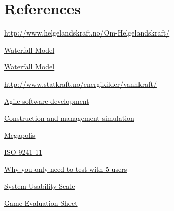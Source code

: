 \chapter{References}

\begin{thebibliography}{99}

	\href {http://www.helgelandskraft.no/Om-Helgelandskraft/}{http://www.helgelandskraft.no/Om-Helgelandskraft/}

	\href {http://en.wikipedia.org/wiki/Waterfall_model}{Waterfall Model}

	\href {http://searchsoftwarequality.techtarget.com/definition/waterfall-model}{Waterfall Model}

	\href {http://www.statkraft.no/energikilder/vannkraft/}{http://www.statkraft.no/energikilder/vannkraft/}

	\href {http://en.wikipedia.org/wiki/Agile_software_development}{Agile software development}

	\href {http://en.wikipedia.org/wiki/Construction_and_management_simulation}{Construction and management simulation}

	\href {https://play.google.com/store/apps/details?id=com.socialquantum.acityint}{Megapolis}

	\href {http://en.wikipedia.org/wiki/ISO_9241#ISO_9241-11}{ISO 9241-11}

	\href {http://www.nngroup.com/articles/why-you-only-need-to-test-with-5-users/}{Why you only need to test with 5 users}

	\href {http://www.measuringusability.com/sus.php}{System Usability Scale}

	\href {http://thebiggamehunter.com/game-evaluation-sheet/}{Game Evaluation Sheet}

\end{thebibliography}
